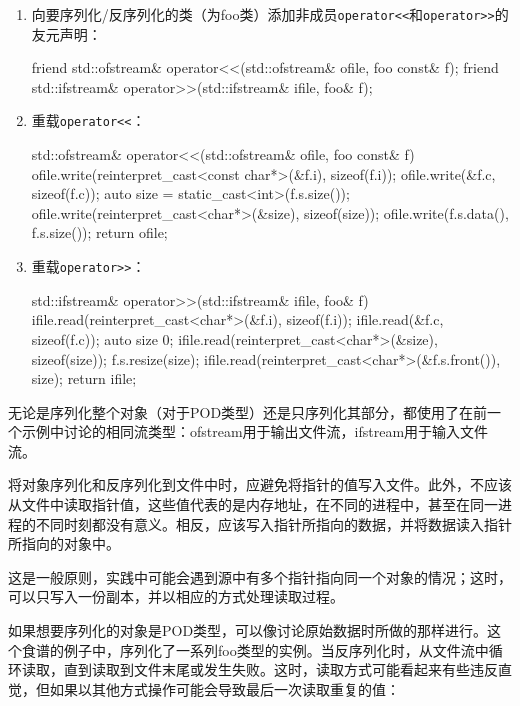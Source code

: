 \begin{enumerate}
\item
向要序列化/反序列化的类（为foo类）添加非成员\verb|operator<<|和\verb|operator>>|的友元声明：

\begin{cpp}
friend std::ofstream& operator<<(std::ofstream& ofile, foo const& f);
friend std::ifstream& operator>>(std::ifstream& ifile, foo& f);
\end{cpp}

\item
重载\verb|operator<<|：

\begin{cpp}
std::ofstream& operator<<(std::ofstream& ofile, foo const& f)
{
    ofile.write(reinterpret_cast<const char*>(&f.i),
                sizeof(f.i));
    ofile.write(&f.c, sizeof(f.c));
    auto size = static_cast<int>(f.s.size());
    ofile.write(reinterpret_cast<char*>(&size), sizeof(size));
    ofile.write(f.s.data(), f.s.size());
    return ofile;
}
\end{cpp}

\item
重载\verb|operator>>|：

\begin{cpp}
std::ifstream& operator>>(std::ifstream& ifile, foo& f)
{
    ifile.read(reinterpret_cast<char*>(&f.i), sizeof(f.i));
    ifile.read(&f.c, sizeof(f.c));
    auto size {0};
    ifile.read(reinterpret_cast<char*>(&size), sizeof(size));
    f.s.resize(size);
    ifile.read(reinterpret_cast<char*>(&f.s.front()), size);
    return ifile;
}
\end{cpp}
\end{enumerate}


无论是序列化整个对象（对于POD类型）还是只序列化其部分，都使用了在前一个示例中讨论的相同流类型：ofstream用于输出文件流，ifstream用于输入文件流。

将对象序列化和反序列化到文件中时，应避免将指针的值写入文件。此外，不应该从文件中读取指针值，这些值代表的是内存地址，在不同的进程中，甚至在同一进程的不同时刻都没有意义。相反，应该写入指针所指向的数据，并将数据读入指针所指向的对象中。

这是一般原则，实践中可能会遇到源中有多个指针指向同一个对象的情况；这时，可以只写入一份副本，并以相应的方式处理读取过程。

如果想要序列化的对象是POD类型，可以像讨论原始数据时所做的那样进行。这个食谱的例子中，序列化了一系列foo类型的实例。当反序列化时，从文件流中循环读取，直到读取到文件末尾或发生失败。这时，读取方式可能看起来有些违反直觉，但如果以其他方式操作可能会导致最后一次读取重复的值：

